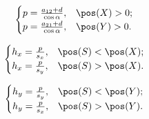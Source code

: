 $$\begin{cases}
	p = \frac{a_{12} + d}{\cos\alpha}, & \pos(X)>0;\\
	p = \frac{a_{21} + d}{\cos\alpha}, & \pos(Y)>0.
\end{cases}$$

$$\begin{cases}
	h_x = \frac{p}{s_x}, & \pos(S)<\pos(X);\\
	h_x = \frac{p}{s_y}, & \pos(S)>\pos(X).
\end{cases}$$

$$\begin{cases}
	h_y = \frac{p}{s_y}, & \pos(S)<\pos(Y);\\
	h_y = \frac{p}{s_x}, & \pos(S)>\pos(Y).
\end{cases}$$